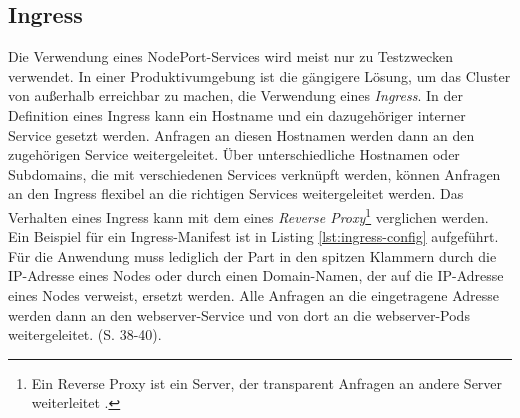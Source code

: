 \documentclass[11pt,a4paper]{article}
\begin{document}
\subsection{Ingress}
\label{sec:Ingress}
Die Verwendung eines NodePort-Services wird meist nur zu Testzwecken verwendet. In einer Produktivumgebung
ist die gängigere Lösung, um das Cluster von außerhalb erreichbar zu machen, die Verwendung eines \emph{Ingress}.
In der Definition eines Ingress kann ein Hostname und ein dazugehöriger interner Service gesetzt werden.
Anfragen an diesen Hostnamen werden dann an den zugehörigen Service weitergeleitet. Über unterschiedliche Hostnamen
oder Subdomains, die mit verschiedenen Services verknüpft werden, können Anfragen an den Ingress flexibel
an die richtigen Services weitergeleitet werden.
Das Verhalten eines Ingress kann mit dem eines \emph{Reverse Proxy}\footnote{Ein Reverse Proxy
  ist ein Server, der transparent Anfragen an andere Server weiterleitet \cite{nginx}.}
verglichen werden.
Ein Beispiel für ein Ingress-Manifest ist in Listing \ref{lst:ingress-config} aufgeführt.
Für die Anwendung muss lediglich der Part in den spitzen Klammern durch die IP-Adresse eines Nodes
oder durch einen Domain-Namen, der auf die IP-Adresse eines Nodes verweist, ersetzt werden.
Alle Anfragen an die eingetragene Adresse werden dann an den webserver-Service
und von dort an die webserver-Pods weitergeleitet. \cite{Schmeling_Dargatz_2022} (S. 38-40).

\end{document}
